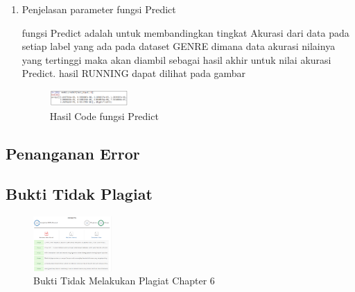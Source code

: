 \begin{enumerate}
            \item Penjelasan parameter fungsi Predict
            
            
            
            \subitem fungsi Predict adalah untuk membandingkan tingkat Akurasi dari data pada setiap label yang ada pada dataset GENRE dimana data akurasi nilainya yang tertinggi maka akan diambil sebagai hasil akhir untuk nilai akurasi Predict. hasil RUNNING dapat dilihat pada gambar
            
            \begin{figure}[H]
                \includegraphics[width=3cm]{figures/1174008/6/12.PNG}
                \centering
                  \caption{Hasil Code fungsi Predict}
            \end{figure}
            \end{enumerate}

\subsection{Penanganan Error}

\subsection{Bukti Tidak Plagiat}
\begin{figure}[H]
\centering
	\includegraphics[width=3cm]{figures/1174008/6/bukticekplagiat.PNG}
	\caption{Bukti Tidak Melakukan Plagiat Chapter 6}
\end{figure}